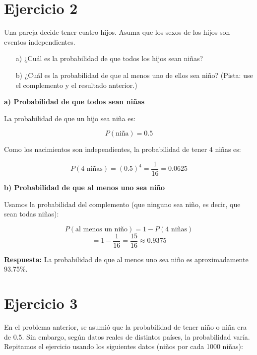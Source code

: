 \documentclass{article}
\begin{document}
\section*{Ejercicio 2}

Una pareja decide tener cuatro hijos. Asuma que los sexos de los hijos son eventos independientes.

\begin{enumerate}
    \item[a)] ¿Cuál es la probabilidad de que todos los hijos sean niñas?

    \item[b)] ¿Cuál es la probabilidad de que al menos uno de ellos sea niño? (Pista: use el complemento y el resultado anterior.)
\end{enumerate}


\textbf{a) Probabilidad de que todos sean niñas}

La probabilidad de que un hijo sea niña es:

\[
P(\text{niña}) = 0.5
\]

Como los nacimientos son independientes, la probabilidad de tener 4 niñas es:

\[
P(\text{4 niñas}) = (0.5)^4 = \frac{1}{16} = 0.0625
\]

\textbf{b) Probabilidad de que al menos uno sea niño}

Usamos la probabilidad del complemento (que ninguno sea niño, es decir, que sean todas niñas):

\[
P(\text{al menos un niño}) = 1 - P(\text{4 niñas})
\]
\[
= 1 - \frac{1}{16} = \frac{15}{16} \approx 0.9375
\]

\textbf{Respuesta:} La probabilidad de que al menos uno sea niño es aproximadamente 93.75\%.

\section*{Ejercicio 3}

En el problema anterior, se asumió que la probabilidad de tener niño o niña era de 0.5. Sin embargo, según datos reales de distintos países, la probabilidad varía. Repitamos el ejercicio usando los siguientes datos (niños por cada 1000 niñas):
\end{document}
